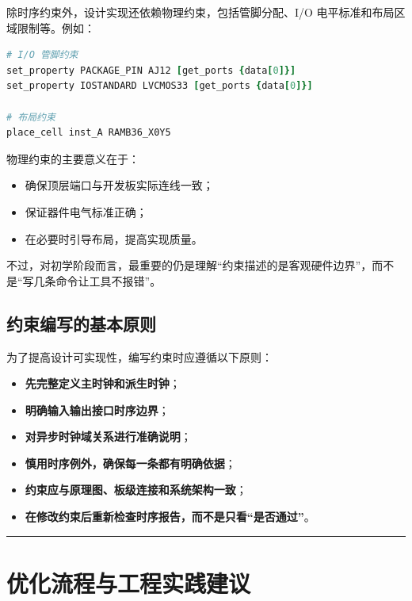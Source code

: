除时序约束外，设计实现还依赖物理约束，包括管脚分配、I/O
电平标准和布局区域限制等。例如：

\begin{lstlisting}[language=tcl]
# I/O 管脚约束
set_property PACKAGE_PIN AJ12 [get_ports {data[0]}]
set_property IOSTANDARD LVCMOS33 [get_ports {data[0]}]

# 布局约束
place_cell inst_A RAMB36_X0Y5
\end{lstlisting}

物理约束的主要意义在于：

\begin{itemize}
\tightlist
\item
  确保顶层端口与开发板实际连线一致；
\item
  保证器件电气标准正确；
\item
  在必要时引导布局，提高实现质量。
\end{itemize}

不过，对初学阶段而言，最重要的仍是理解``约束描述的是客观硬件边界''，而不是``写几条命令让工具不报错''。

\subsection{约束编写的基本原则}\label{ux7ea6ux675fux7f16ux5199ux7684ux57faux672cux539fux5219}

为了提高设计可实现性，编写约束时应遵循以下原则：

\begin{itemize}
\tightlist
\item
  \textbf{先完整定义主时钟和派生时钟}；
\item
  \textbf{明确输入输出接口时序边界}；
\item
  \textbf{对异步时钟域关系进行准确说明}；
\item
  \textbf{慎用时序例外，确保每一条都有明确依据}；
\item
  \textbf{约束应与原理图、板级连接和系统架构一致}；
\item
  \textbf{在修改约束后重新检查时序报告，而不是只看``是否通过''}。
\end{itemize}

\begin{center}\rule{0.5\linewidth}{0.5pt}\end{center}

\section{优化流程与工程实践建议}\label{ux4f18ux5316ux6d41ux7a0bux4e0eux5de5ux7a0bux5b9eux8df5ux5efaux8bae}

